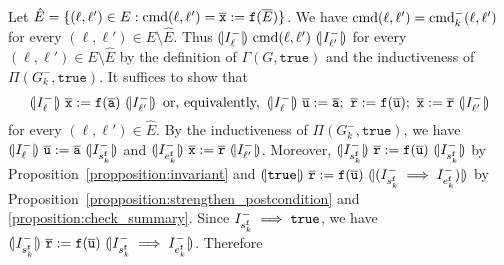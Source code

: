 Let $\hat{E} = \{ (\ell, \ell') \in E : \textmd{cmd} (\ell, \ell') =
\overline{\mathtt{x}} := \mathtt{f} (\overline{E}) \}$. We have
$\textmd{cmd} (\ell, \ell') = \textmd{cmd}^-_k (\ell, \ell')$ for every
$(\ell, \ell') \in E \setminus \hat{E}$. Thus $(\!| {I^-_{\ell}} |\!)\
\textmd{cmd} (\ell, \ell')\ (\!| {I^-_{\ell'}} |\!)$ for every $(\ell,
\ell') \in E \setminus \hat{E}$ by the definition of $\Gamma (G,
\mathtt{true})$ and the inductiveness of $\Pi (G^-_k,
\mathtt{true})$. It suffices to show that
\begin{equation*}
  \assert{I^-_{\ell}}\
  \overline{\mathtt{x}} := \mathtt{f} (\overline{\mathtt{a}})
  \ \assert{I^-_{\ell'}}
  \hspace{0.5em}
  \textmd{or, equivalently,}
  \hspace{0.5em}
  \assert{I^-_{\ell}}\ 
  \overline{\mathtt{u}} := \overline{\mathtt{a}};\ 
  \mathtt{\overline{r}} := \mathtt{f} (\overline{\mathtt{u}});\ 
  \overline{\mathtt{x}} := \mathtt{\overline{r}}
  \ \assert{I^-_{\ell'}}
\end{equation*}
for every $(\ell, \ell') \in \hat{E}$. 
By the inductiveness of $\Pi (G^-_k, \mathtt{true})$, we have
$\assert{I^-_{\ell}}\ \overline{\mathtt{u}} := \overline{\mathtt{a}}\
\assert{I^-_{s_k^\fun{f}}}$ and
$(\!| {I^-_{e_k^{\mathtt{{f}}}}} |\!)\ \overline{\mathtt{x}} :=
\mathtt{\overline{r}}\ (\!| {I^-_{\ell'}} |\!)$. 
Moreover,
$(\!| {I^-_{s_k^\mathtt{f}}} |\!)\
\mathtt{\overline{r}} := \mathtt{f}
(\overline{\mathtt{u}})\ (\!| {I^-_{s_k^{\mathtt{{f}}}}} |\!)$ 
by Proposition~\ref{propposition:invariant}
and
$(\!| {\mathtt{true}} |\!)\ \mathtt{\overline{r}} := \mathtt{f}
(\overline{\mathtt{u}})\ (\!| {(I^-_{s_k^{\mathtt{{f}}}} \implies
  I^-_{e_k^{\mathtt{{f}}}})} |\!)$ by Proposition~\ref{propposition:strengthen_postcondition} and \ref{proposition:check_summary}.
Since $I^-_{s_k^{\mathtt{{f}}}} \implies \mathtt{true}$, we have
$(\!| {I^-_{s_k^{\mathtt{{f}}}}} |\!)\
\mathtt{\overline{r}} := \mathtt{f}
(\overline{\mathtt{u}})\  (\!| {I^-_{s_k^{\mathtt{{f}}}}
  \implies I^-_{e_k^{\mathtt{{f}}}}} |\!)$. Therefore
\begin{prooftree}

    \noLine



\end{prooftree}